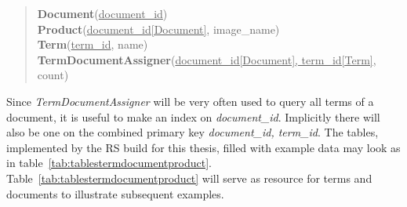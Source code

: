 \begin{quote}
    \textbf{Document}{(\underline{document\_id})}\\
    \textbf{Product}{(\underline{document\_id[Document]}, image\_name)}\\
    \textbf{Term}{(\underline{term\_id}, name)}\\
    \textbf{TermDocumentAssigner}{(\underline{document\_id[Document], term\_id[Term]}, count)}\\
\end{quote}
\noindent
Since \textit{TermDocumentAssigner} will be very often used to query all terms of a document, it is useful to make an index on \textit{document\_id}.
Implicitly there will also be one on the combined primary key \textit{document\_id, term\_id}.
The tables, implemented by the RS build for this thesis, filled with example data may look as in table~\ref{tab:tablestermdocumentproduct}.
Table~\ref{tab:tablestermdocumentproduct} will serve as resource for terms and documents to illustrate subsequent examples.\\

